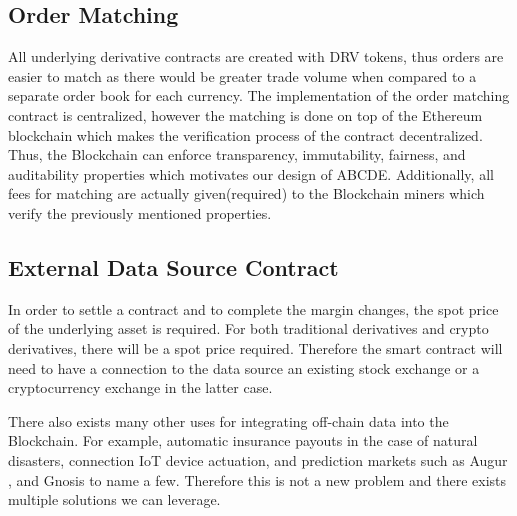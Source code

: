 \subsection{Order Matching}
All underlying derivative contracts are created with DRV tokens, thus orders are easier to match as there would be greater trade volume when compared to a separate order book for each currency.
The implementation of the order matching contract is centralized, however the  matching is done on top of the Ethereum blockchain which makes the verification process of the contract decentralized.
Thus, the Blockchain can enforce transparency, immutability, fairness, and auditability properties which motivates our design of ABCDE.
Additionally, all fees for matching are actually given(required) to the Blockchain miners which verify the previously mentioned properties.

\subsection{External Data Source Contract}
\label{oracle}
In order to settle a contract and to complete the margin changes, the spot price of the underlying asset is required.
For both traditional derivatives and crypto derivatives, there will be a spot price required.
Therefore the smart contract will need to have a connection to the data source an existing stock exchange or a cryptocurrency exchange in the latter case.

There also exists many other uses for integrating off-chain data into the Blockchain.
For example, automatic insurance payouts in the case of natural disasters, connection IoT device actuation, and prediction markets such as Augur \cite{Augur} \cite{Truthcoin}, and Gnosis \cite{Gnosis} to name a few.
Therefore this is not a new problem and there exists multiple solutions we can leverage.

